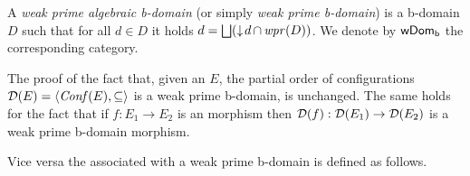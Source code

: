 

\begin{definition}
  \label{a-de:fusion-domain-new}
  A \emph{weak prime algebraic b-domain} (or simply \emph{weak prime
    b-domain}) is a {\wi} b-domain $D$ such that for all $d \in D$ it
  holds $d = \bigsqcup (\mathop{\downarrow\!{d}} \cap \mathop{\mathit{wpr}({D})})$. We denote by
  $\mathsf{wDom_b}$ the corresponding category.
\end{definition}


The proof of the fact that, given an {\esnabbr} ${E}$, the partial order of
configurations $\mathcal{D}({{E}}) = \langle \mathit{Conf}({{E}}), \subseteq \rangle$ is
a weak prime b-domain, is unchanged. The same holds for the fact that
if $f : E_1 \to E_2$ is an {\esnabbr} morphism then
$\mathcal{D}({f}) : \mathcal{D}({{E}_1}) \to \mathcal{D}({{E}_2})$ is a weak prime b-domain
morphism.


Vice versa the {\esnabbr} associated with a
weak prime b-domain is defined as follows.

